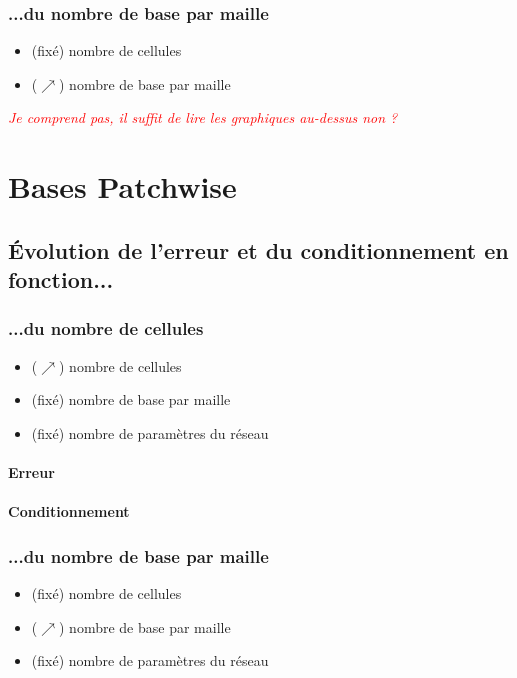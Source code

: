 \documentclass[12pt,a4paper]{article}
\let\oldparagraph\paragraph
\renewcommand{\paragraph}[1]{\oldparagraph{#1}\leavevmode}
\begin{document}
\subsubsection{...du nombre de base par maille}

\begin{itemize}
    \item (fixé) nombre de cellules
    \item ($\nearrow$) nombre de base par maille
\end{itemize}

\textcolor{red}{\textit{Je comprend pas, il suffit de lire les graphiques au-dessus non ?}}

\newpage
\section{Bases Patchwise}

\subsection{Évolution de l'erreur et du conditionnement en fonction...}

\subsubsection{...du nombre de cellules}

\begin{itemize}
    \item ($\nearrow$) nombre de cellules
    \item (fixé) nombre de base par maille
    \item (fixé) nombre de paramètres du réseau
\end{itemize}

\paragraph{Erreur}

\paragraph{Conditionnement}

\subsubsection{...du nombre de base par maille}

\begin{itemize}
    \item (fixé) nombre de cellules
    \item ($\nearrow$) nombre de base par maille
    \item (fixé) nombre de paramètres du réseau
\end{itemize}
\end{document}

